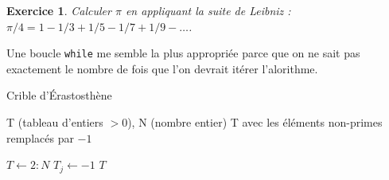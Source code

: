 \documentclass[a4paper]{article}
\DeclarePairedDelimiter\floor{\lfloor}{\rfloor}
\newtheorem{exercice}{Exercice}
\theoremstyle{definition}
\begin{document}
\setcounter{exercice}{0}

\begin{exercice}
    Calculer $\pi$ en appliquant la suite de Leibniz : $\pi/4 = 1 - 1/3 + 1/5 - 1/7 + 1/9 - \dots$.
\end{exercice}

Une boucle \verb|while| me semble la plus appropri\'ee parce que on ne sait pas exactement le nombre de fois que l'on
devrait it\'erer l'alorithme.

\begin{algorithm}[h!]
    \caption{Crible d'\'Erastosth\`ene}\label{alg:cap}
    \Entree T (tableau d'entiers $> 0$), N (nombre entier)
    \Sortie T avec les \'el\'ements non-primes remplac\'es par $-1$
    \begin{algorithmic}[1]
    \State $T \gets 2:N$
    \State $T_j \gets -1$
    \EndIf
    \EndFor
    \EndFor
    \State \Return $T$
    \end{algorithmic}
\end{algorithm}
\end{document}
